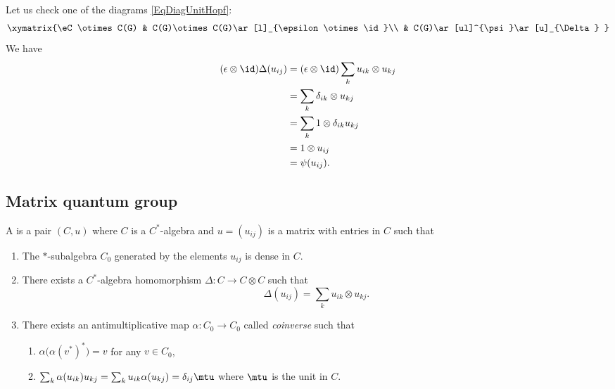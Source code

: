 Let us check one of the diagrams \eqref{EqDiagUnitHopf}:
\begin{equation}
    \xymatrix{%
    \eC\otimes C(G)     &   C(G)\otimes C(G)\ar[l]_{\epsilon\otimes\id}\\
    &   C(G)\ar[ul]^{\psi}\ar[u]_{\Delta}
       }
\end{equation}
We have
\begin{equation}
    \begin{aligned}[]
        (\epsilon\otimes\id)\Delta(u_{ij})&=(\epsilon\otimes\id)\sum_k u_{ik}\otimes u_{kj}\\
        &=\sum_k\delta_{ik}\otimes u_{kj}\\
        &=\sum_k1\otimes \delta_{ik}u_{kj}\\
        &=1\otimes u_{ij}\\
        &=\psi(u_{ij}).
    \end{aligned}
\end{equation}

\subsection{Matrix quantum group}

\begin{definition}      \label{DefQuantumMatrixGroup}
    A  is a pair $(C,u)$ where $C$ is a $C^*$-algebra and $u=(u_{ij})$ is a matrix with entries in $C$ such that
    \begin{enumerate}
        \item
            The $*$-subalgebra $C_0$ generated by the elements $u_{ij}$ is dense in $C$.
        \item
            There exists a $C^*$-algebra homomorphism $\Delta\colon C\to C\otimes C$ such that
            \begin{equation}
                \Delta(u_{ij})=\sum_k u_{ik}\otimes u_{kj}.
            \end{equation}
        \item\label{DefQuantumMatrixGroupItemiii}
            There exists an antimultiplicative map $\alpha\colon C_0\to C_0$ called \emph{coinverse} such that
            \begin{enumerate}
                \item
                    $\alpha\big( \alpha(v^*)^* \big)=v$ for any $v\in C_0$,
                \item
                    $\sum_k\alpha(u_{ik})u_{kj}=\sum_ku_{ik}\alpha(u_{kj})=\delta_{ij}\mtu$ where $\mtu$ is the unit in $C$.
            \end{enumerate}
    \end{enumerate}
\end{definition}

